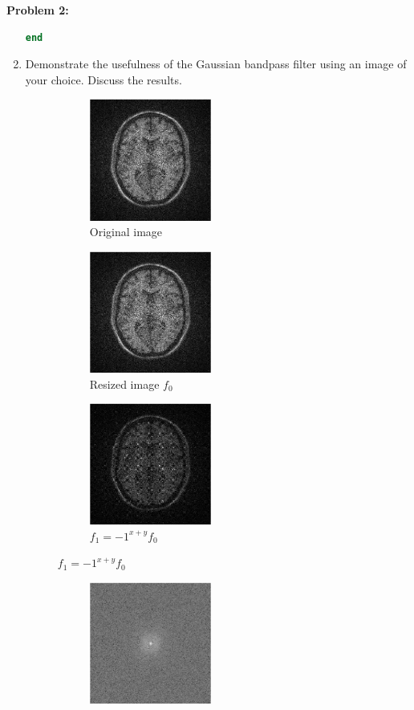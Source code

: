 \documentclass[11pt]{article}
\newenvironment{problem}[1]{\textbf{Problem #1: }}{\newpage}
\begin{document}
\begin{problem}{2}
\begin{enumerate}[label = (\alph*)]
\begin{lstlisting}[language=Matlab]
end
\end{lstlisting}
			\newpage
			\item Demonstrate the usefulness of the Gaussian bandpass filter using an image of your choice.  Discuss the results. 
			\begin{figure}[h!]
				\centering
				\begin{subfigure}[h!]{.3\textwidth}
					\centering
					\includegraphics[height = 4cm]{Figures/Prob2/1}
					\caption{Original image}
				\end{subfigure}
				\begin{subfigure}[h!]{.3\textwidth}
					\centering
					\includegraphics[height = 4cm]{Figures/Prob2/2}
					\caption{Resized image $f_0$}
				\end{subfigure}
				\begin{subfigure}[h!]{.3\textwidth}
					\centering
					\includegraphics[height = 4cm]{Figures/Prob2/3}
					\caption{$f_1 = -1^{x+y}f_0$}
				\end{subfigure}
			\end{figure}
			\begin{figure}[h!]
				\centering
				\begin{subfigure}[h!]{.3\textwidth}
					\centering
					\includegraphics[height = 4cm]{Figures/Prob2/4}

\end{subfigure}
\end{figure}
\end{enumerate}
\end{problem}
\end{document}
